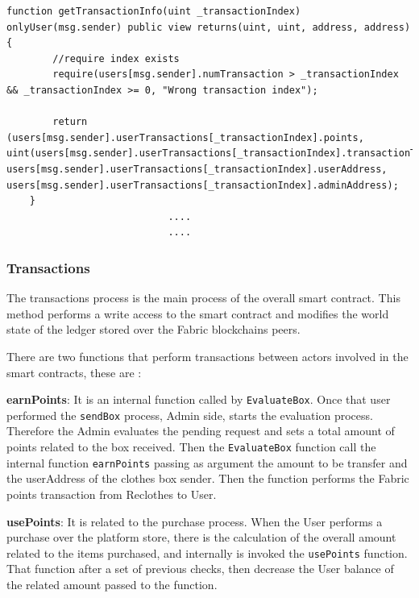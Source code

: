 \begin{lstlisting}[language=Solidity]
    function getTransactionInfo(uint _transactionIndex) onlyUser(msg.sender) public view returns(uint, uint, address, address) {
        //require index exists
        require(users[msg.sender].numTransaction > _transactionIndex && _transactionIndex >= 0, "Wrong transaction index");

        return (users[msg.sender].userTransactions[_transactionIndex].points, uint(users[msg.sender].userTransactions[_transactionIndex].transactionType), users[msg.sender].userTransactions[_transactionIndex].userAddress, users[msg.sender].userTransactions[_transactionIndex].adminAddress);
    }
                            ....
                            ....

\end{lstlisting}

\subsubsection{Transactions}

The transactions process is the main process of the overall smart contract. This method performs a
write access to the smart contract and modifies  the world state of the ledger stored over the Fabric blockchains peers. 
\bigskip 

There are two functions that perform transactions between actors involved in the smart contracts,
these are :

\begin{outline}[enumerate]
    \1 \textbf{earnPoints}: It is an internal function called by \texttt{EvaluateBox}.
    Once that user performed the \texttt{sendBox} process, Admin side, starts the evaluation process.
    Therefore the Admin evaluates the pending request and sets a total amount of points related to 
    the box received. Then the \texttt{EvaluateBox} function call the internal function \texttt{earnPoints}
    passing as argument the amount to be transfer and the userAddress of the clothes box sender. Then
    the function performs the Fabric points transaction from Reclothes to User.
    
     \1 \textbf{usePoints}: It is related to the purchase process. When the User performs a purchase over
     the platform store, there is the calculation of the overall amount related to the items purchased, and internally
     is invoked the \texttt{usePoints} function. That function after a set of previous checks, then 
     decrease the User balance of the related amount passed to the function.
\end{outline}

